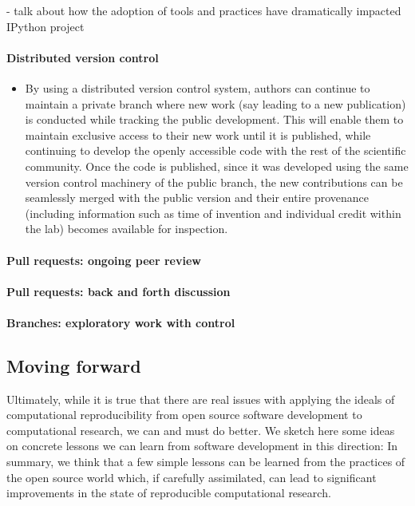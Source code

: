 \documentclass[ChapterTOCs,krantz2]{krantz} %
\begin{document}
- talk about how the adoption of tools and practices have dramatically
impacted IPython project

\paragraph{ {\bf Distributed version control}}

\begin{itemize}
\item By using a distributed version control system, authors can continue
to maintain a private branch where new work (say leading to a new
publication) is conducted while tracking the public development. This
will enable them to maintain exclusive access to their new work until
it is published, while continuing to develop the openly accessible
code with the rest of the scientific community. Once the code is published,
since it was developed using the same version control machinery of
the public branch, the new contributions can be seamlessly merged
with the public version and their entire provenance (including information
such as time of invention and individual credit within the lab) becomes
available for inspection.
\end{itemize}

\paragraph{ {\bf Pull requests: ongoing peer review}}

\paragraph{ {\bf Pull requests: back and forth discussion}}

\paragraph{ {\bf Branches: exploratory work with control}}


\subsection{Moving forward }

Ultimately, while it is true that there are real issues with applying
the ideals of computational reproducibility from open source software
development to computational research, we can and must do better.
We sketch here some ideas on concrete lessons we can learn from software
development in this direction:
In summary, we think that a few simple lessons can be learned from
the practices of the open source world which, if carefully assimilated,
can lead to significant improvements in the state of reproducible
computational research. 
\end{document}
